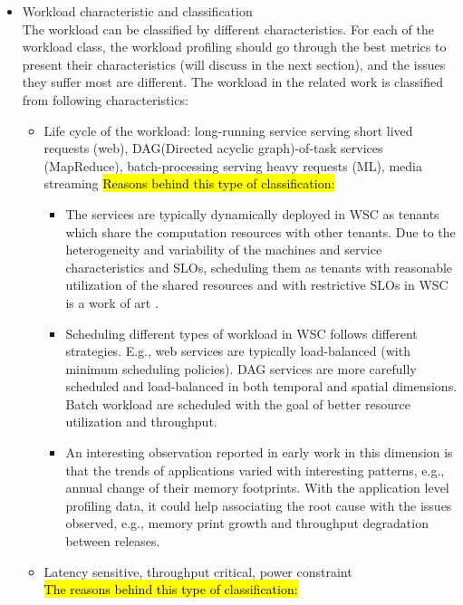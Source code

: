 \begin{itemize}
  \item Workload characteristic and classification \autocite{DBLP:journals/micro/KanevDHRMWB16,DBLP:journals/micro/RenTMSRH10,DBLP:conf/bigdataconf/LuYXXB17,DBLP:conf/cluster/DiKC12}\\
  The workload can be classified by different characteristics. For each of the workload class, the workload profiling should go through the best metrics to present their characteristics (will discuss in the next section), and the issues they suffer most are different.
  The workload in the related work is classified from following characteristics:
    \begin{itemize}
      \item Life cycle of the workload: long-running service serving short lived requests (web), DAG(Directed acyclic graph)-of-task services (MapReduce), batch-processing serving heavy requests (ML), media streaming
       \hl{Reasons behind this type of classification:}
          \begin{itemize}
            \item The services are typically dynamically deployed in WSC as tenants which share the computation resources with other tenants. Due to the heterogeneity and variability of the machines and service characteristics and SLOs, scheduling them as tenants with reasonable utilization of the shared resources and with restrictive SLOs in WSC is a work of art \autocite{DBLP:conf/asplos/FerdmanAKVAJKPAF12, DBLP:journals/micro/KanevDHRMWB16, DBLP:conf/iwqos/GuoCWDFMB19}.
            \item Scheduling different types of workload in WSC follows different strategies. E.g., web services are typically load-balanced (with minimum scheduling policies). DAG services are more carefully scheduled and load-balanced in both temporal and spatial dimensions. Batch workload are scheduled with the goal of better resource utilization and throughput.
            \item An interesting observation reported in early work in this dimension is that the trends of applications varied with interesting patterns, e.g., annual change of their memory footprints. With the application level profiling data, it could help associating the root cause with the issues observed, e.g., memory print growth and throughput degradation between releases.
          \end{itemize}
      \item Latency sensitive, throughput critical, power constraint \\
        \hl{The reasons behind this type of classification:}


\end{itemize}
\end{itemize}
